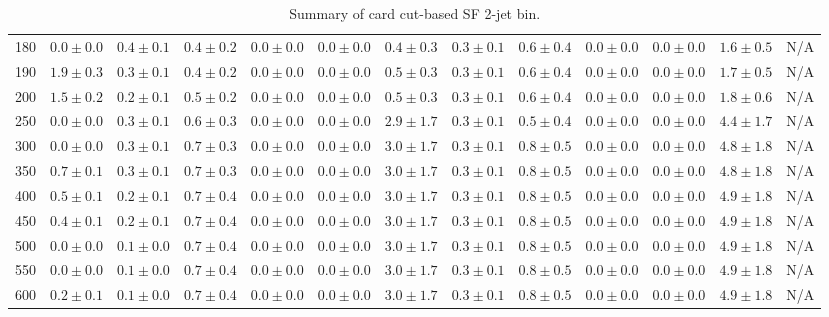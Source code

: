 \begin{table}
{\begin{center}
\begin{tabular}{l | c c | c c c c c c c c  | c c}
180 & $0.0\pm0.0$ & $0.4\pm0.1$ & $0.4\pm0.2$ & $0.0\pm0.0$ & $0.0\pm0.0$ & $0.4\pm0.3$ & $0.3\pm0.1$ & $0.6\pm0.4$ & $0.0\pm0.0$ & $0.0\pm0.0$ & $1.6\pm0.5$ & N/A \\
190 & $1.9\pm0.3$ & $0.3\pm0.1$ & $0.4\pm0.2$ & $0.0\pm0.0$ & $0.0\pm0.0$ & $0.5\pm0.3$ & $0.3\pm0.1$ & $0.6\pm0.4$ & $0.0\pm0.0$ & $0.0\pm0.0$ & $1.7\pm0.5$ & N/A \\
200 & $1.5\pm0.2$ & $0.2\pm0.1$ & $0.5\pm0.2$ & $0.0\pm0.0$ & $0.0\pm0.0$ & $0.5\pm0.3$ & $0.3\pm0.1$ & $0.6\pm0.4$ & $0.0\pm0.0$ & $0.0\pm0.0$ & $1.8\pm0.6$ & N/A \\
250 & $0.0\pm0.0$ & $0.3\pm0.1$ & $0.6\pm0.3$ & $0.0\pm0.0$ & $0.0\pm0.0$ & $2.9\pm1.7$ & $0.3\pm0.1$ & $0.5\pm0.4$ & $0.0\pm0.0$ & $0.0\pm0.0$ & $4.4\pm1.7$ & N/A \\
300 & $0.0\pm0.0$ & $0.3\pm0.1$ & $0.7\pm0.3$ & $0.0\pm0.0$ & $0.0\pm0.0$ & $3.0\pm1.7$ & $0.3\pm0.1$ & $0.8\pm0.5$ & $0.0\pm0.0$ & $0.0\pm0.0$ & $4.8\pm1.8$ & N/A \\
350 & $0.7\pm0.1$ & $0.3\pm0.1$ & $0.7\pm0.3$ & $0.0\pm0.0$ & $0.0\pm0.0$ & $3.0\pm1.7$ & $0.3\pm0.1$ & $0.8\pm0.5$ & $0.0\pm0.0$ & $0.0\pm0.0$ & $4.8\pm1.8$ & N/A \\
400 & $0.5\pm0.1$ & $0.2\pm0.1$ & $0.7\pm0.4$ & $0.0\pm0.0$ & $0.0\pm0.0$ & $3.0\pm1.7$ & $0.3\pm0.1$ & $0.8\pm0.5$ & $0.0\pm0.0$ & $0.0\pm0.0$ & $4.9\pm1.8$ & N/A \\
450 & $0.4\pm0.1$ & $0.2\pm0.1$ & $0.7\pm0.4$ & $0.0\pm0.0$ & $0.0\pm0.0$ & $3.0\pm1.7$ & $0.3\pm0.1$ & $0.8\pm0.5$ & $0.0\pm0.0$ & $0.0\pm0.0$ & $4.9\pm1.8$ & N/A \\
500 & $0.0\pm0.0$ & $0.1\pm0.0$ & $0.7\pm0.4$ & $0.0\pm0.0$ & $0.0\pm0.0$ & $3.0\pm1.7$ & $0.3\pm0.1$ & $0.8\pm0.5$ & $0.0\pm0.0$ & $0.0\pm0.0$ & $4.9\pm1.8$ & N/A \\
550 & $0.0\pm0.0$ & $0.1\pm0.0$ & $0.7\pm0.4$ & $0.0\pm0.0$ & $0.0\pm0.0$ & $3.0\pm1.7$ & $0.3\pm0.1$ & $0.8\pm0.5$ & $0.0\pm0.0$ & $0.0\pm0.0$ & $4.9\pm1.8$ & N/A \\
600 & $0.2\pm0.1$ & $0.1\pm0.0$ & $0.7\pm0.4$ & $0.0\pm0.0$ & $0.0\pm0.0$ & $3.0\pm1.7$ & $0.3\pm0.1$ & $0.8\pm0.5$ & $0.0\pm0.0$ & $0.0\pm0.0$ & $4.9\pm1.8$ & N/A \\
\hline
\end{tabular}
\end{center}
}
\caption{Summary of card cut-based SF 2-jet bin.}
\end{table}

